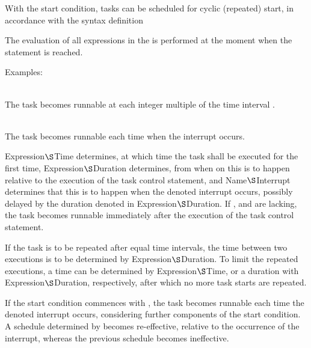 With the start condition, tasks can be scheduled for cyclic (repeated)
start, in accordance with the syntax definition

\begin{grammarframe}



\end{grammarframe}

The evaluation of all expressions in the  is performed 
at the moment when the  statement is reached. 

Examples:

\\
The task  becomes runnable at each integer
multiple of the time interval .

\\
The task  becomes runnable each time when the
interrupt  occurs.

  
 Expression$\S $Time determines, at which time the task shall be
executed for the first time, 
 Expression$\S $Duration determines,
from when on this is to happen relative to the execution of the task
control statement, and  
 Name$\S $Interrupt determines that this is
to happen when the denoted interrupt occurs, possibly delayed by the
duration denoted in  Expression$\S $Duration.
 If ,  and  
are lacking, the task becomes runnable immediately after the execution
of the task control statement.

If the task is to be repeated after equal time intervals, the time between
two executions is to be determined by 
 Expression$\S $Duration. 
To limit the repeated executions, a time can be determined by 
 Expression$\S $Time, or 
a duration with
  Expression$\S $Duration,
respectively, after which no more task starts are repeated.

If the start condition commences with , the task becomes runnable
each time the denoted interrupt occurs, considering further components
of the start condition. A schedule determined by  becomes
re-effective, relative to the occurrence of the interrupt, whereas the
previous schedule becomes ineffective.

